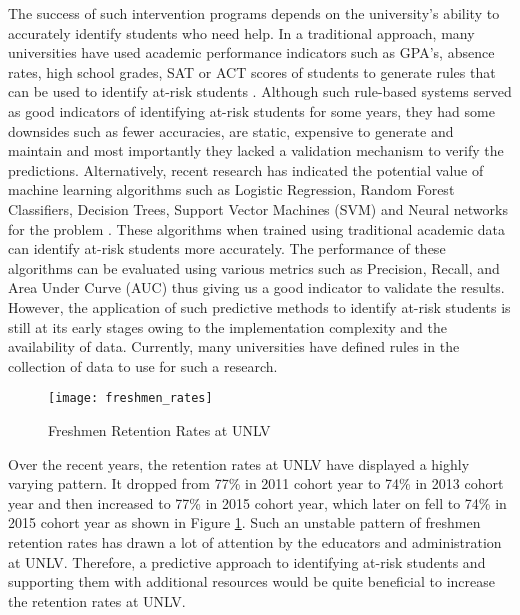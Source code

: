 \documentclass[11pt,openright]{report}
\begin{document}
The success of such intervention programs depends on the university's ability to accurately identify students who need help. In a traditional approach, many universities have used academic performance indicators such as GPA's, absence rates, high school grades, SAT or ACT scores of students to generate rules that can be used to identify at-risk  students \cite{bingham2016}. Although such rule-based systems served as good indicators of identifying at-risk students for some years, they had some downsides such as fewer accuracies, are static, expensive to generate and maintain and most importantly they lacked a validation mechanism to verify the predictions. Alternatively, recent research has indicated the potential value of machine learning algorithms such as Logistic Regression, Random Forest Classifiers, Decision Trees, Support Vector Machines (SVM) and Neural networks for the problem \cite{plagge2013using,lakkaraju2015machine,marbouti2016models}. These algorithms when trained using traditional academic data can identify at-risk students more accurately. The performance of these algorithms can be evaluated using various metrics such as Precision, Recall, and Area Under Curve (AUC) thus giving us a good indicator to validate the results. However, the application of such predictive methods to identify at-risk students is still at its early stages owing to the implementation complexity and the availability of data. Currently, many universities have defined rules in the collection of data to use for such a research.
\begin{figure}
	\centering
	\texttt{[image: freshmen\_rates]}
	\caption{Freshmen Retention Rates at UNLV}
	\label{fig:unlv_retention_trend}
\end{figure}

Over the recent years, the retention rates at UNLV have displayed a highly varying pattern. It dropped from 77\% in 2011 cohort year to 74\% in 2013 cohort year and then increased to 77\% in 2015 cohort year, which later on fell to 74\% in 2015 cohort year as shown in Figure \ref{fig:unlv_retention_trend}. Such an unstable pattern of freshmen retention rates has drawn a lot of attention by the educators and administration at UNLV. Therefore, a predictive approach to identifying at-risk students and supporting them with additional resources would be quite beneficial to increase the retention rates at UNLV. 
\end{document}
